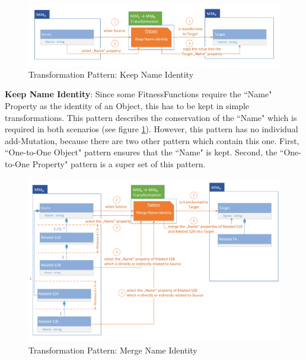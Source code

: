   
\begin{figure}[!ht]
	\centering
	\includegraphics[scale=0.48, trim=0cm 0cm 0cm 0cm, clip=true]{Images/TransformationPattern_KeepNameIdentity.pdf} 
	\caption{Transformation Pattern: Keep Name Identity}
	\label{figTransformationPattern_KeepNameIdentity}
\end{figure} 
 
\textbf{Keep Name Identity}: Since some \glspl{FitnessFunction} require the ``Name" \gls{Property} as the identity of an \gls{Object}, this has to be kept in simple transformations. This pattern describes the conservation of the ``Name" which is required in both scenarios (see figure \ref{figTransformationPattern_KeepNameIdentity}). However, this pattern has no individual add-\gls{Mutation}, because there are two other pattern which contain this one. First, ``One-to-One Object" pattern ensures that the ``Name" is kept. Second, the ``One-to-One Property" pattern is a super set of this pattern.

	
\begin{figure}[!ht]
	\centering
	\includegraphics[scale=0.48, trim=0cm 0cm 0cm 0cm, clip=true]{Images/TransformationPattern_MergeNameIdentity.pdf} 
	\caption{Transformation Pattern: Merge Name Identity}
	\label{figTransformationPattern_MergeNameIdentity}
\end{figure} 
 

